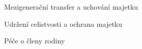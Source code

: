 \documentclass{article}
\begin{document}
  \begin{enumerate}
 {\Large\item[4.] Mezigenerační transfer a uchování majetku}
 \end{enumerate}
 
  \begin{enumerate}
 {\Large\item[5.] Udržení celistvosti a ochrana majetku}
 \end{enumerate}
 
  \begin{enumerate}
 {\Large\item[6.] Péče o členy rodiny}
 \end{enumerate}
 
 
 
 


\end{document}
